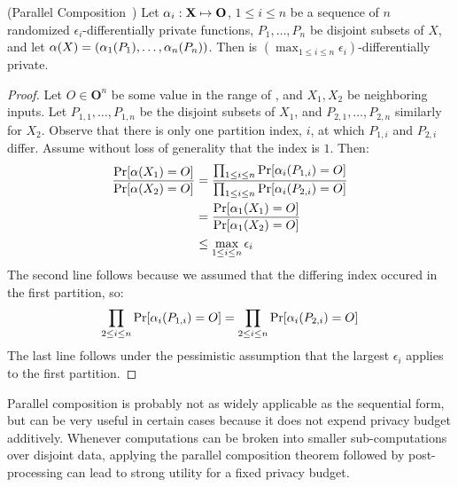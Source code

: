 \documentclass[11pt,twoside]{scrartcl}
\begin{document}
\begin{theorem}{(Parallel Composition~\cite{McSherry2009})}
Let $\alpha_i : \mathbf{X} \mapsto \mathbf{O}$, $1 \le i \le n$ be a sequence of $n$ randomized $\epsilon_i$-differentially private functions, $P_1, \ldots, P_n$ be disjoint subsets of $X$, and let $\alpha(X) = (\alpha_1(P_1), \ldots, \alpha_n(P_n))$. Then \san is $(\max_{1 \le i \le n} \epsilon_i)$-differentially private.
\end{theorem}

\begin{proof}
Let $O \in \mathbf{O}^n$ be some value in the range of \san, and $X_1, X_2$ be neighboring inputs. Let $P_{1,1}, \ldots, P_{1,n}$ be the disjoint subsets of $X_1$, and $P_{2,1}, \ldots, P_{2,n}$ similarly for $X_2$. Observe that there is only one partition index, $i$, at which $P_{1,i}$ and $P_{2,i}$ differ. Assume without loss of generality that the index is $1$. Then:
\begin{align*}
\frac{
  \mathrm{Pr}[\alpha(X_1) = O]
}{
  \mathrm{Pr}[\alpha(X_2) = O]
}
&=
\frac{
  \prod_{1 \le i \le n} \mathrm{Pr}[\alpha_i(P_{1,i}) = O]
}{
  \prod_{1 \le i \le n} \mathrm{Pr}[\alpha_i(P_{2,i}) = O]
}
\\
&=
\frac{
  \mathrm{Pr}[\alpha_1(X_1) = O]
}{
  \mathrm{Pr}[\alpha_1(X_2) = O]
}
\\
&\le
\max_{1 \le i \le n} \epsilon_i
\end{align*}
The second line follows because we assumed that the differing index occured in the first partition, so:
\[
\prod_{2 \le i \le n} \mathrm{Pr}[\alpha_i(P_{1,i}) = O] = \prod_{2 \le i \le n} \mathrm{Pr}[\alpha_i(P_{2,i}) = O]
\]
The last line follows under the pessimistic assumption that the largest $\epsilon_i$ applies to the first partition.
\end{proof}

Parallel composition is probably not as widely applicable as the sequential form, but can be very useful in certain cases because it does not expend privacy budget additively. Whenever computations can be broken into smaller sub-computations over disjoint data, applying the parallel composition theorem followed by post-processing can lead to strong utility for a fixed privacy budget.



\end{document}
